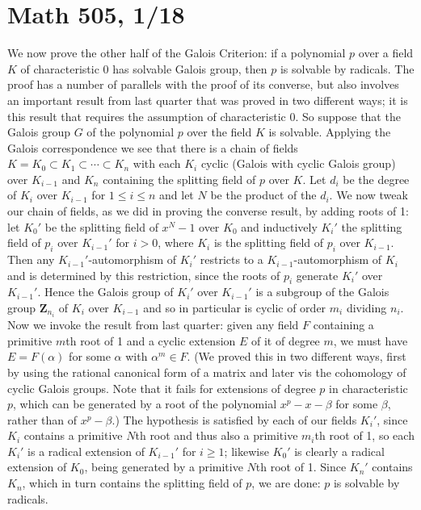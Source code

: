 \documentclass[10pt]{article}
\begin{document}
\section*{Math 505, 1/18}

We now prove the other half of the Galois Criterion: if a polynomial $p$
over a field $K$ of characteristic 0 has solvable Galois group, then $p$
is solvable by radicals. The proof has a number of parallels with the
proof of its converse, but also involves an important result from last
quarter that was proved in two different ways; it is this result that
requires the assumption of characteristic 0. So suppose that the Galois
group $G$ of the polynomial $p$ over the field $K$ is solvable. Applying
the Galois correspondence we see that there is a chain of fields $K=K_0
\subset K_1\subset\cdots\subset K_n$ with each $K_i$ cyclic (Galois with
cyclic Galois group) over $K_{i-1}$ and $K_n$ containing the splitting
field of $p$ over $K$. Let $d_i$ be the degree of $K_i$ over $K_{i-1}$
for $1\le i\le n$ and let $N$ be the product of the $d_i$. We now tweak
our chain of fields, as we did in proving the converse result, by adding
roots of 1: let $K_0'$ be the splitting field of $x^N - 1$ over $K_0$
and inductively $K_i'$ the splitting field of $p_i$ over $K_{i-1}'$ for
$i>0$, where $K_i$ is the splitting field of $p_i$ over $K_{i-1}$. Then
any $K_{i-1}'$-automorphism of $K_i'$ restricts to a
$K_{i-1}$-automorphism of $K_i$ and is determined by this restriction,
since the roots of $p_i$ generate $K_i'$ over $K_{i-1}'$. Hence the
Galois group of $K_i'$ over $K_{i-1}'$ is a subgroup of the Galois group
$\mathbf Z_{n_i}$ of $K_i$ over $K_{i-1}$ and so in particular is cyclic
of order $m_i$ dividing $n_i$. Now we invoke the result from last
quarter: given any field $F$ containing a primitive $m$th root of 1 and
a cyclic extension $E$ of it of degree $m$, we must have $E=F(\alpha)$
for some $\alpha$ with $\alpha^m\in F$. (We proved this in two different
ways, first by using the rational canonical form of a matrix and later
vis the cohomology of cyclic Galois groups. Note that it fails for
extensions of degree $p$ in characteristic $p$, which can be generated
by a root of the polynomial $x^p - x - \beta$ for some $\beta$, rather
than of $x^p - \beta$.) The hypothesis is satisfied by each of our
fields $K_i'$, since $K_i$ contains a primitive $N$th root and thus also
a primitive $m_i$th root of 1, so each $K_i'$ is a radical extension of
$K_{i-1}'$ for $i\ge1$; likewise $K_0'$ is clearly a radical extension
of $K_0$, being generated by a primitive $N$th root of 1. Since $K_n'$
contains $K_n$, which in turn contains the splitting field of $p$, we
are done: $p$ is solvable by radicals.
\end{document}
